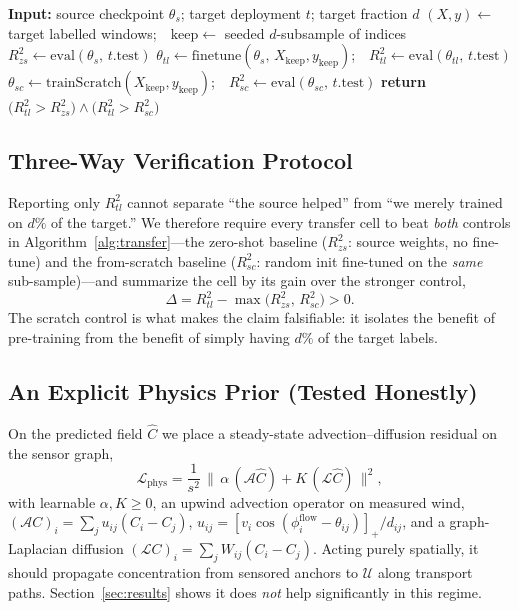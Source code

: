 \documentclass[journal]{IEEEtran}
\begin{document}
\begin{algorithm}[!t]
\caption{Cold-start transfer with three-way verification, per $(\text{source},\text{target},d)$ cell}
\label{alg:transfer}
\begin{algorithmic}[1]
\STATE \textbf{Input:} source checkpoint $\theta_s$; target deployment $t$; target fraction $d$
\STATE $(X,y)\leftarrow$ target labelled windows;\ \ $\mathrm{keep}\leftarrow$ seeded $d$-subsample of indices
\STATE $R^2_{zs}\leftarrow \mathrm{eval}(\theta_s,\,t.\mathrm{test})$ 
\STATE $\theta_{tl}\leftarrow \mathrm{finetune}(\theta_s,\,X_{\mathrm{keep}},y_{\mathrm{keep}})$;\ \ $R^2_{tl}\leftarrow \mathrm{eval}(\theta_{tl},\,t.\mathrm{test})$
\STATE $\theta_{sc}\leftarrow \mathrm{trainScratch}(X_{\mathrm{keep}},y_{\mathrm{keep}})$;\ \ $R^2_{sc}\leftarrow \mathrm{eval}(\theta_{sc},\,t.\mathrm{test})$
\STATE \textbf{return} $\big(R^2_{tl}>R^2_{zs}\big)\wedge\big(R^2_{tl}>R^2_{sc}\big)$ 
\end{algorithmic}
\end{algorithm}

\subsection{Three-Way Verification Protocol}\label{sec:verify}
Reporting only $R^2_{tl}$ cannot separate ``the source helped'' from ``we merely trained on $d\%$ of the target.'' We therefore require every transfer cell to beat \emph{both} controls in Algorithm~\ref{alg:transfer}---the zero-shot baseline ($R^2_{zs}$: source weights, no fine-tune) and the from-scratch baseline ($R^2_{sc}$: random init fine-tuned on the \emph{same} sub-sample)---and summarize the cell by its gain over the stronger control,
\begin{equation}
\Delta = R^2_{tl}-\max\!\big(R^2_{zs},\,R^2_{sc}\big)>0.
\label{eq:gain}
\end{equation}
The scratch control is what makes the claim falsifiable: it isolates the benefit of pre-training from the benefit of simply having $d\%$ of the target labels.

\subsection{An Explicit Physics Prior (Tested Honestly)}\label{sec:physics}
On the predicted field $\hat{C}$ we place a steady-state advection--diffusion residual on the sensor graph,
\begin{equation}
\mathcal{L}_{\mathrm{phys}}=\frac{1}{s^2}\,\big\lVert\,\alpha\,(\mathcal{A}\hat{C})+K\,(\mathcal{L}\hat{C})\,\big\rVert^2,
\label{eq:phys}
\end{equation}
with learnable $\alpha,K\!\ge\!0$, an upwind advection operator on measured wind, $(\mathcal{A}C)_i=\sum_j u_{ij}(C_i-C_j)$, $u_{ij}=[v_i\cos(\phi^{\mathrm{flow}}_i-\theta_{ij})]_+/d_{ij}$, and a graph-Laplacian diffusion $(\mathcal{L}C)_i=\sum_j W_{ij}(C_i-C_j)$. Acting purely spatially, it should propagate concentration from sensored anchors to $\mathcal{U}$ along transport paths. Section~\ref{sec:results} shows it does \emph{not} help significantly in this regime.
\end{document}
